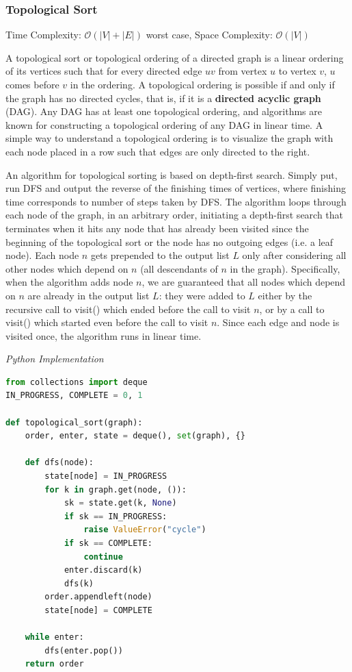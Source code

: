 \documentclass{article}
\newcommand{\bigO}{\mathcal{O}}
\begin{document}
    
    \subsubsection{Topological Sort}
    Time Complexity: $\bigO(|V| + |E|)$ worst case,  Space Complexity: $\bigO(|V|)$
    
    A topological sort or topological ordering of a directed graph is a linear ordering of its vertices such that for every directed edge $uv$ from vertex $u$ to vertex $v$, $u$ comes before $v$ in the ordering. A topological ordering is possible if and only if the graph has no directed cycles, that is, if it is a \textbf{directed acyclic graph} (DAG). Any DAG has at least one topological ordering, and algorithms are known for constructing a topological ordering of any DAG in linear time. A simple way to understand a topological ordering is to visualize the graph with each node placed in a row such that edges are only directed to the right.
    
    An algorithm for topological sorting is based on depth-first search. Simply put, run DFS and output the reverse of the finishing times of vertices, where finishing time corresponds to number of steps taken by DFS. The algorithm loops through each node of the graph, in an arbitrary order, initiating a depth-first search that terminates when it hits any node that has already been visited since the beginning of the topological sort or the node has no outgoing edges (i.e. a leaf node). Each node $n$ gets prepended to the output list $L$ only after considering all other nodes which depend on $n$ (all descendants of $n$ in the graph). Specifically, when the algorithm adds node $n$, we are guaranteed that all nodes which depend on $n$ are already in the output list $L$: they were added to $L$ either by the recursive call to visit() which ended before the call to visit $n$, or by a call to visit() which started even before the call to visit $n$. Since each edge and node is visited once, the algorithm runs in linear time.

\vspace{8pt} \emph{Python Implementation}
\begin{lstlisting}[language=Python]
from collections import deque
IN_PROGRESS, COMPLETE = 0, 1

def topological_sort(graph):
    order, enter, state = deque(), set(graph), {}

    def dfs(node):
        state[node] = IN_PROGRESS
        for k in graph.get(node, ()):
            sk = state.get(k, None)
            if sk == IN_PROGRESS:
                raise ValueError("cycle")
            if sk == COMPLETE:
                continue
            enter.discard(k)
            dfs(k)
        order.appendleft(node)
        state[node] = COMPLETE

    while enter:
        dfs(enter.pop())
    return order
\end{lstlisting}
\end{document}
